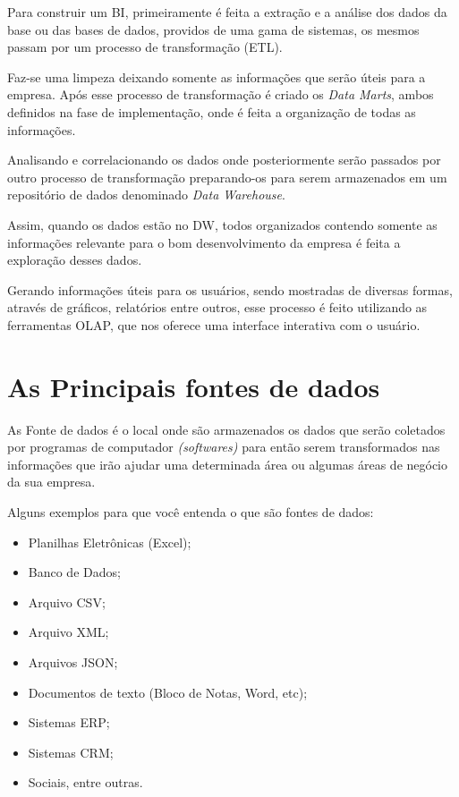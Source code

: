 Para construir um BI, primeiramente \'{e} feita a extra\c{c}\~{a}o e a an\'{a}lise dos dados da base ou das bases de dados, providos de uma gama de sistemas, os mesmos passam por um processo de transforma\c{c}\~{a}o (ETL).  

Faz-se uma limpeza deixando somente as informa\c{c}\~{o}es que ser\~{a}o úteis para a empresa. Ap\'{o}s esse processo de transforma\c{c}\~{a}o \'{e} criado os \textit{Data Marts}, ambos definidos na fase de implementa\c{c}\~{a}o, onde \'{e} feita a organiza\c{c}\~{a}o de todas as informa\c{c}\~{o}es. 

Analisando e correlacionando os dados onde posteriormente ser\~{a}o passados por outro processo de transforma\c{c}\~{a}o preparando-os para serem armazenados em um reposit\'{o}rio de dados denominado \textit{Data Warehouse}. 

Assim, quando os dados est\~{a}o no DW, todos organizados contendo somente as informa\c{c}\~{o}es relevante para o bom desenvolvimento da empresa \'{e} feita a explora\c{c}\~{a}o desses dados. 

Gerando informa\c{c}\~{o}es úteis para os usu\'{a}rios, sendo mostradas de diversas formas, atrav\'{e}s de gr\'{a}ficos, relat\'{o}rios entre outros, esse processo \'{e} feito utilizando as ferramentas OLAP, que nos oferece uma interface interativa com o usu\'{a}rio.

\section{As Principais fontes de dados}

As Fonte de dados \'{e} o local onde s\~{a}o armazenados os dados que ser\~{a}o coletados por programas de computador \textit{(softwares)} para ent\~{a}o serem transformados nas informa\c{c}\~{o}es que ir\~{a}o ajudar uma determinada \'{a}rea ou algumas \'{a}reas de neg\'{o}cio da sua empresa.

Alguns exemplos para que voc\^{e} entenda o que s\~{a}o fontes de dados:

\begin{itemize}

    \item Planilhas Eletrônicas (Excel);
    \item Banco de Dados;
    \item Arquivo CSV;
    \item Arquivo XML;
    \item Arquivos JSON;
    \item Documentos de texto (Bloco de Notas, Word, etc);
    \item Sistemas ERP;
    \item Sistemas CRM;
    \item Sociais, entre outras.
    
\end{itemize}

